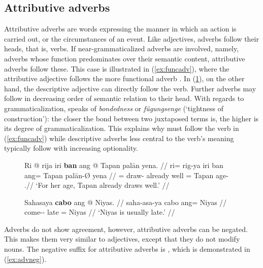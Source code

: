 \subsection{Attributive adverbs}

Attributive adverbs are words expressing the manner in which an action is
carried out, or the circumstances of an event. Like adjectives, adverbs follow
their heads, that is, verbs. If near-grammaticalized adverbs are involved,
namely, adverbs whose function predominates over their semantic content,
attributive adverbs follow these. This case is illustrated in
(\ref{ex:funcadv}), where the attributive adjective 
follows the more functional adverb . In
(\ref{ex:attradv}), on the other hand, the descriptive adjective
 can directly follow the verb. Further adverbs may
follow in decreasing order of semantic relation to their head. With regards to
grammaticalization, \citet[157\psqq]{lehmann2015} speaks of \emph{bondedness}
or \emph{fügungsenge} (`tightness of construction'): the closer the bond
between two juxtaposed terms is, the higher is its degree of
grammaticalization. This explains why  must follow the verb in
(\ref{ex:funcadv}) while descriptive adverbs less central to the verb's meaning
typically follow with increasing optionality.

\begin{figure}[h]
\pex
\a\label{ex:funcadv}\begingl
	\gla Ri @ rija iri \textbf{ban} ang @ Tapan palān yena. //
	\glb ri= rig-ya iri ban ang= Tapan palān-Ø yena //
	\glc \InsT{}= draw-\TsgM{} already well \Aarg{}= Tapan age-\Top{} 
		\TsgF{}.\Gen //
	\glft `For her age, Tapan already draws well.' //
\endgl

\a\label{ex:attradv}\begingl
	\gla Sahasaya \textbf{cabo} ang @ Niyas. //
	\glb saha-asa-ya cabo ang= Niyas //
	\glc come-\Hab{}-\TsgM{} late \Aarg{}= Niyas //
	\glft `Niyas is usually late.' //
\endgl
\xe
\end{figure}

Adverbs do not show agreement, however, attributive adverbs can be negated.
This makes them very similar to adjectives, except that they do not modify
nouns. The negative suffix for attributive adverbs is , which is
demonstrated in (\ref{ex:advneg}).

